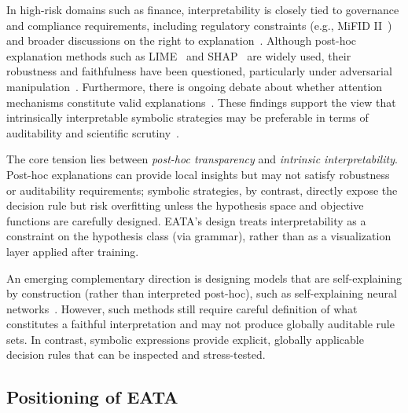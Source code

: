 In high-risk domains such as finance, interpretability is closely tied to governance and compliance requirements, including regulatory constraints (e.g., MiFID II~\cite{eu2014mifid}) and broader discussions on the right to explanation~\cite{goodman2017european}. Although post-hoc explanation methods such as LIME~\cite{ribeiro2016should} and SHAP~\cite{lundberg2017unified} are widely used, their robustness and faithfulness have been questioned, particularly under adversarial manipulation~\cite{slack2020fooling}. Furthermore, there is ongoing debate about whether attention mechanisms constitute valid explanations~\cite{jain2019attention,serrano2019attention,wiegreffe2019attention}. These findings support the view that intrinsically interpretable symbolic strategies may be preferable in terms of auditability and scientific scrutiny~\cite{rudin2019stop,weber2024comprehensive,cAo2022ai}.

The core tension lies between \emph{post-hoc transparency} and \emph{intrinsic interpretability}. Post-hoc explanations can provide local insights but may not satisfy robustness or auditability requirements; symbolic strategies, by contrast, directly expose the decision rule but risk overfitting unless the hypothesis space and objective functions are carefully designed. EATA's design treats interpretability as a constraint on the hypothesis class (via grammar), rather than as a visualization layer applied after training.

An emerging complementary direction is designing models that are self-explaining by construction (rather than interpreted post-hoc), such as self-explaining neural networks~\cite{alvarez2018towards}. However, such methods still require careful definition of what constitutes a faithful interpretation and may not produce globally auditable rule sets. In contrast, symbolic expressions provide explicit, globally applicable decision rules that can be inspected and stress-tested.

\subsection{Positioning of EATA}

